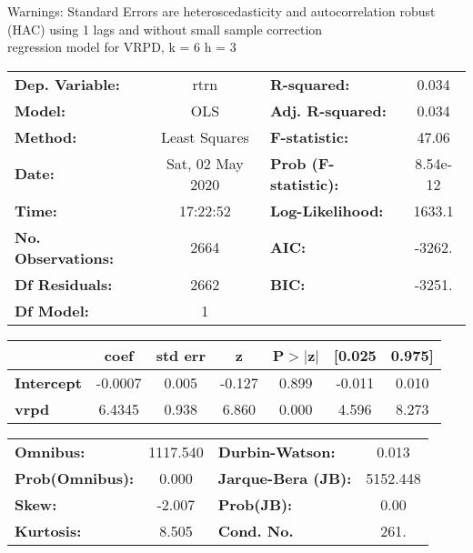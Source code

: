 Warnings: \newline
 [1] Standard Errors are heteroscedasticity and autocorrelation robust (HAC) using 1 lags and without small sample correction\\ 

regression model for VRPD, k = 6 h = 3\begin{center}
\begin{tabular}{lclc}
\toprule
\textbf{Dep. Variable:}    &       rtrn       & \textbf{  R-squared:         } &     0.034   \\
\textbf{Model:}            &       OLS        & \textbf{  Adj. R-squared:    } &     0.034   \\
\textbf{Method:}           &  Least Squares   & \textbf{  F-statistic:       } &     47.06   \\
\textbf{Date:}             & Sat, 02 May 2020 & \textbf{  Prob (F-statistic):} &  8.54e-12   \\
\textbf{Time:}             &     17:22:52     & \textbf{  Log-Likelihood:    } &    1633.1   \\
\textbf{No. Observations:} &        2664      & \textbf{  AIC:               } &    -3262.   \\
\textbf{Df Residuals:}     &        2662      & \textbf{  BIC:               } &    -3251.   \\
\textbf{Df Model:}         &           1      & \textbf{                     } &             \\
\bottomrule
\end{tabular}
\begin{tabular}{lcccccc}
                   & \textbf{coef} & \textbf{std err} & \textbf{z} & \textbf{P$> |$z$|$} & \textbf{[0.025} & \textbf{0.975]}  \\
\midrule
\textbf{Intercept} &      -0.0007  &        0.005     &    -0.127  &         0.899        &       -0.011    &        0.010     \\
\textbf{vrpd}      &       6.4345  &        0.938     &     6.860  &         0.000        &        4.596    &        8.273     \\
\bottomrule
\end{tabular}
\begin{tabular}{lclc}
\textbf{Omnibus:}       & 1117.540 & \textbf{  Durbin-Watson:     } &    0.013  \\
\textbf{Prob(Omnibus):} &   0.000  & \textbf{  Jarque-Bera (JB):  } & 5152.448  \\
\textbf{Skew:}          &  -2.007  & \textbf{  Prob(JB):          } &     0.00  \\
\textbf{Kurtosis:}      &   8.505  & \textbf{  Cond. No.          } &     261.  \\
\bottomrule
\end{tabular}
\end{center}

